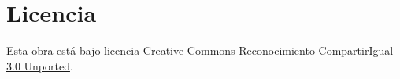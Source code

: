 \documentclass[11pt,onecolumn]{article}
\begin{document}


\clearpage

        



\clearpage

\section*{Licencia}
Esta obra está bajo licencia \href{http://creativecommons.org/licenses/by-sa/3.0/}{Creative Commons Reconocimiento-CompartirIgual 3.0 Unported}.
\end{document}

